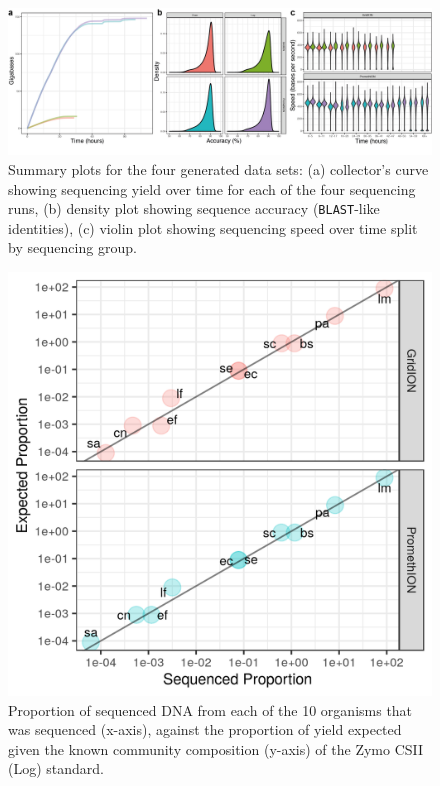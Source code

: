 \documentclass[a4paper,num-refs]{oup-contemporary}
\begin{document}
\begin{figure}[t!] 
\centering
\includegraphics[width=0.995\linewidth]{figures/Figure1.png}
\caption{
Summary plots for the four generated data sets:
(a) collector's curve showing sequencing yield over time for each of the four sequencing runs,
(b) density plot showing sequence accuracy (\texttt{BLAST}-like identities),
(c) violin plot showing sequencing speed over time split by sequencing group.
}\label{fig:summaries}
\end{figure}
\begin{figure}[b!]
\centering
\includegraphics[width=\linewidth]{figures/log-ove.png}
\caption{Proportion of sequenced DNA from each of the 10 organisms that was sequenced (x-axis), against the proportion of yield expected given the known community composition (y-axis) of the Zymo CSII (Log) standard.}\label{fig:log-ove}
\end{figure}
\end{document}
